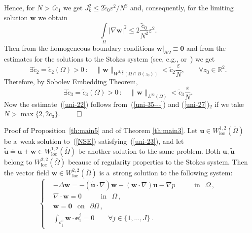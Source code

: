\documentclass[11pt]{article}
\numberwithin{equation}{section}
\numberwithin{figure}{section}
\newcommand{\R}{\mathbb{R}}
\def\loc{{\mathrm{loc}}}
\def\R{{\mathbb R}}
\def\ue{{\mathbf u}}
\def\cc{{\tilde c}}
\def\tu{{\tilde{\mathbf u}}}
\def\0{{\mathbf 0}}
\def\ee{{\mathbf e}}
\def\we{{\mathbf w}}
\def\e{{\varepsilon}}
\begin{document}
Hence, for $N>4\cc_1$ we get $J_k^2\le2{\cc_0}\e^2/{N^2} $ and, consequently, for the limiting solution $\we$ we obtain
$$\int\limits_\Omega|\nabla\we|^2\le2\frac{\cc_0}{N^2}\e^2.$$
Then 
from the homogeneous boundary conditions $\we|_{\partial\Omega}\equiv\0$   and  from the estimates for the solutions to the Stokes system (see, e.g., \cite[Section~IV.6]{galdi2011introduction} or
\cite[Section~2.4.2]{korobkov2024steady}\,) we get
\begin{equation}  \label{uni-35}
\exists \cc_2=\cc_2(\Omega)>0\, :\quad\|\we\|_{W^{2,\frac32}(\Omega\cap B(z_0))}<\cc_2\frac{\e}{N},\qquad\forall z_0\in\R^2.
\end{equation}
Therefore, by Sobolev Embedding Theorem, 
\begin{equation}  \label{uni-35---}
\exists \cc_3=\cc_3(\Omega)>0\, :\quad\|\we\|_{L^\infty(\Omega)}<\cc_3\frac{\e}{N}.
\end{equation}
Now the estimate~(\ref{uni-22}) follows from~(\ref{uni-35---}) and (\ref{uni-27})$_{2}$ if we take  $N>\max\{2,2\cc_3\}$.  \hfill $\qed$

\medskip
{\sc Proof of Proposition~\ref{th:main5} and of Theorem \ref{th:main3}}. Let $\ue\in W^{1,2}_\loc(\overline\Omega)$ be a~weak solution
to~(\ref{NSE}) satisfying~(\ref{uni-23}), and let $\tu\doteq \ue+\we\in W^{1,2}_\loc(\overline\Omega)$ be another solution to the same problem. Both $\ue,\tu$ belong to $W^{2,2}_\loc(\overline\Omega)$ because of regularity properties to the Stokes system. Then the vector field $\mathbf{w} \in W_{\text{loc}}^{2,2}(\overline\Omega)$ is a~strong solution to the following system:
\begin{equation}  \label{NSE-www}
	\left\{
	\begin{aligned}
		&- \Delta \mathbf{w} =- (\tu \cdot \nabla) \mathbf{w} -(\mathbf{w} \cdot \nabla) \mathbf{u} - \nabla p   \qquad  \ \ \mbox{ in } \ \ \Omega \, , \\[4pt]
		& \nabla \cdot \mathbf{w} = 0\qquad  \ \ \mbox{ in } \ \ \Omega \, ,  \\[4pt]
		&\mathbf{w} = \0 \ \ \mbox{ on } \ \ \partial \Omega \, , \\[4pt]
		&  	\int_{\sigma_j^0} \mathbf{w} \cdot \ee_1^j = 0 \qquad \forall j \in \{1,\dots,J \} \, .
	\end{aligned}
	\right.
\end{equation}
\end{document}
